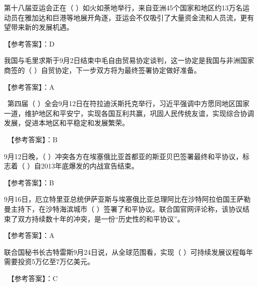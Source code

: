 \question 第十八届亚运会正在（
）如火如荼地举行，来自亚洲45个国家和地区约13万名运动员在雅加达和巨港等地展开角逐，亚运会不仅吸引了大量资金流和人员流，更有望带来新的发展机遇。
\par{}
\begin{solution}【参考答案】：D~~
\end{solution}
\question 我国与毛里求斯于9月2日结束中毛自由贸易协定谈判，这一协定是我国与非洲国家商签的（
）自贸协定，下一步双方将为最终签署协定做好准备。
\par{}
\begin{solution}【参考答案】：A~
\end{solution}
\question ~第四届（
）全会9月12日在符拉迪沃斯托克举行，习近平强调中方愿同地区国家一道，维护地区和平安宁，实现各国互利共赢，巩固人民传统友谊，实现综合协调发展，促进本地区和平稳定和发展繁荣。
\par{}
\begin{solution}~【参考答案】：B
\end{solution}
\question 9月12日晚，（
）冲突各方在埃塞俄比亚首都亚的斯亚贝巴签署最终和平协议，标志着（
）自2013年底爆发的内战宣告结束。
\par{}
\begin{solution}【参考答案】：B~
\end{solution}
\question 9月16日，厄立特里亚总统伊萨亚斯与埃塞俄比亚总理阿比在沙特阿拉伯国王萨勒曼主持下，在沙特海滨城市（
）签署了和平协议。联合国官网评论称，该协议结束了双方持续数十年的冲突，是一份``历史性的和平协议''。
\par{}
\begin{solution}【参考答案】：A~~
\end{solution}
\question 联合国秘书长古特雷斯9月24日说，从全球范围看，实现（
）可持续发展议程每年需要投资5万亿至7万亿美元。
\par{}
\begin{solution}~【参考答案】：C~~
\end{solution}
